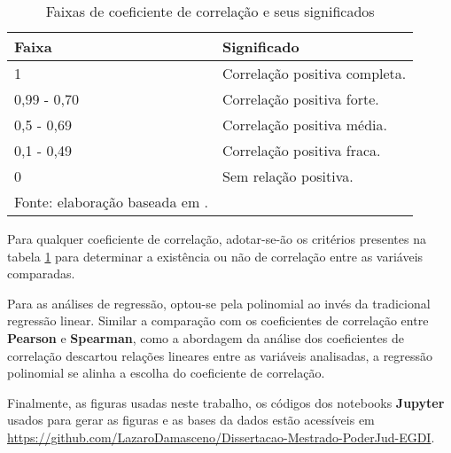 \begin{longtable}[c]{@{}ll@{}}
	\caption{Faixas de coeficiente de correlação e seus significados}
	\label{tab:faixas-coeficiente-correlacao}\\
	\toprule
	\endfirsthead
	\toprule
	\endhead
	\textbf{Faixa} & \textbf{Significado} \\ \midrule
	1           & Correlação positiva completa. \\ \midrule
	0,99 - 0,70 & Correlação positiva forte.    \\ \midrule
	0,5 - 0,69  & Correlação positiva média.    \\ \midrule
	0,1 - 0,49  & Correlação positiva fraca.    \\ \midrule
	0           & Sem relação positiva.         \\ \bottomrule
	\footnotesize{Fonte: elaboração baseada em \cite{ali2022spearman}.}
\end{longtable}

Para qualquer coeficiente de correlação, adotar-se-ão os critérios presentes na tabela \ref{tab:faixas-coeficiente-correlacao} para determinar a existência ou não de correlação entre as variáveis comparadas.

Para as análises de regressão, optou-se pela polinomial ao invés da tradicional regressão linear. Similar a comparação com os coeficientes de correlação entre \textbf{Pearson} e \textbf{Spearman}, como a abordagem da análise dos coeficientes de correlação descartou relações lineares entre as variáveis analisadas, a regressão polinomial se alinha a escolha do coeficiente de correlação.

Finalmente, as figuras usadas neste trabalho, os códigos dos notebooks \textbf{Jupyter} usados para gerar as figuras e as bases da dados estão acessíveis em \url{https://github.com/LazaroDamasceno/Dissertacao-Mestrado-PoderJud-EGDI}.